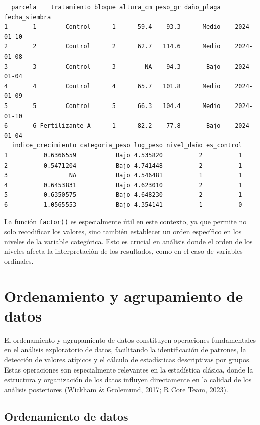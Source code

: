\documentclass[
  spanish,
  a4paper,
  DIV=11,
  numbers=noendperiod,
  onepage,
  openany]{scrreprt}
\begin{document}
\begin{verbatim}
  parcela    tratamiento bloque altura_cm peso_gr daño_plaga fecha_siembra
1       1        Control      1      59.4    93.3      Medio    2024-01-10
2       2        Control      2      62.7   114.6      Medio    2024-01-08
3       3        Control      3        NA    94.3       Bajo    2024-01-04
4       4        Control      4      65.7   101.8      Medio    2024-01-09
5       5        Control      5      66.3   104.4      Medio    2024-01-10
6       6 Fertilizante A      1      82.2    77.8       Bajo    2024-01-04
  indice_crecimiento categoria_peso log_peso nivel_daño es_control
1          0.6366559           Bajo 4.535820          2          1
2          0.5471204           Bajo 4.741448          2          1
3                 NA           Bajo 4.546481          1          1
4          0.6453831           Bajo 4.623010          2          1
5          0.6350575           Bajo 4.648230          2          1
6          1.0565553           Bajo 4.354141          1          0
\end{verbatim}

La función \texttt{factor()} es especialmente útil en este contexto, ya
que permite no solo recodificar los valores, sino también establecer un
orden específico en los niveles de la variable categórica. Esto es
crucial en análisis donde el orden de los niveles afecta la
interpretación de los resultados, como en el caso de variables
ordinales.

\section{Ordenamiento y agrupamiento de
datos}\label{ordenamiento-y-agrupamiento-de-datos}

El ordenamiento y agrupamiento de datos constituyen operaciones
fundamentales en el análisis exploratorio de datos, facilitando la
identificación de patrones, la detección de valores atípicos y el
cálculo de estadísticas descriptivas por grupos. Estas operaciones son
especialmente relevantes en la estadística clásica, donde la estructura
y organización de los datos influyen directamente en la calidad de los
análisis posteriores (Wickham \& Grolemund, 2017; R Core Team, 2023).

\subsection{Ordenamiento de datos}\label{ordenamiento-de-datos}
\end{document}
